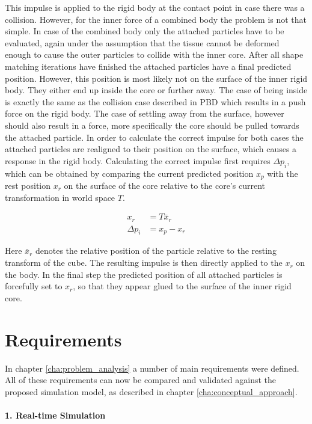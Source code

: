 This impulse is applied to the rigid body at the contact point in case there was a collision. However, for  the inner force of a combined body the problem is not that simple. In case of the combined body only the attached particles have to be evaluated, again under the assumption that the tissue cannot be deformed enough to cause the outer particles to collide with the inner core. After all shape matching iterations have finished the attached particles have a final predicted position. However, this position is most likely not on the surface of the inner rigid body. They either end up inside the core or further away. The case of being inside is exactly the same as the collision case described in PBD which results in a push force on the rigid body. The case of settling away from the surface, however should also result in a force, more specifically the core should be pulled towards the attached particle. In order to calculate the correct impulse for both cases the attached particles are realigned to their position on the surface, which causes a response in the rigid body. Calculating the correct impulse first requires $\Delta p_i$, which can be obtained by comparing the current predicted position $x_p$ with the rest position $x_r$ on the surface of the core relative to the core's current transformation in world space $T$.

\begin{align}
x_r &= T\bar{x}_r \\
\Delta p_i &= x_p - x_r
\end{align}

Here $\bar{x}_r$ denotes the relative position of the particle relative to the resting transform of the cube. The resulting impulse is then directly applied to the $x_r$ on the body. In the final step the predicted position of all attached particles is forcefully set to $x_r$, so that they appear glued to the surface of the inner rigid core.

\section{Requirements}

In chapter \ref{cha:problem_analysis} a number of main requirements were defined. All of these requirements can now be compared and validated against the proposed simulation model, as described in chapter \ref{cha:conceptual_approach}.

\paragraph{1. Real-time Simulation}

